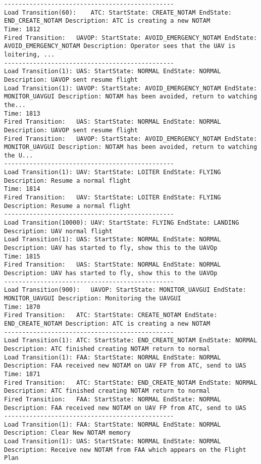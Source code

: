 \begin{spacing}{1}
\begin{verbatim}
-----------------------------------------------
Load Transition(60):	ATC: StartState: CREATE_NOTAM EndState: END_CREATE_NOTAM Description: ATC is creating a new NOTAM
Time: 1812
Fired Transition:	UAVOP: StartState: AVOID_EMERGENCY_NOTAM EndState: AVOID_EMERGENCY_NOTAM Description: Operator sees that the UAV is loitering, ...
-----------------------------------------------
Load Transition(1):	UAS: StartState: NORMAL EndState: NORMAL Description: UAVOP sent resume flight
Load Transition(1):	UAVOP: StartState: AVOID_EMERGENCY_NOTAM EndState: MONITOR_UAVGUI Description: NOTAM has been avoided, return to watching the...
Time: 1813
Fired Transition:	UAS: StartState: NORMAL EndState: NORMAL Description: UAVOP sent resume flight
Fired Transition:	UAVOP: StartState: AVOID_EMERGENCY_NOTAM EndState: MONITOR_UAVGUI Description: NOTAM has been avoided, return to watching the U...
-----------------------------------------------
Load Transition(1):	UAV: StartState: LOITER EndState: FLYING Description: Resume a normal flight
Time: 1814
Fired Transition:	UAV: StartState: LOITER EndState: FLYING Description: Resume a normal flight
-----------------------------------------------
Load Transition(10000):	UAV: StartState: FLYING EndState: LANDING Description: UAV normal flight
Load Transition(1):	UAS: StartState: NORMAL EndState: NORMAL Description: UAV has started to fly, show this to the UAVOp
Time: 1815
Fired Transition:	UAS: StartState: NORMAL EndState: NORMAL Description: UAV has started to fly, show this to the UAVOp
-----------------------------------------------
Load Transition(900):	UAVOP: StartState: MONITOR_UAVGUI EndState: MONITOR_UAVGUI Description: Monitoring the UAVGUI
Time: 1870
Fired Transition:	ATC: StartState: CREATE_NOTAM EndState: END_CREATE_NOTAM Description: ATC is creating a new NOTAM
-----------------------------------------------
Load Transition(1):	ATC: StartState: END_CREATE_NOTAM EndState: NORMAL Description: ATC finished creating NOTAM return to normal
Load Transition(1):	FAA: StartState: NORMAL EndState: NORMAL Description: FAA received new NOTAM on UAV FP from ATC, send to UAS
Time: 1871
Fired Transition:	ATC: StartState: END_CREATE_NOTAM EndState: NORMAL Description: ATC finished creating NOTAM return to normal
Fired Transition:	FAA: StartState: NORMAL EndState: NORMAL Description: FAA received new NOTAM on UAV FP from ATC, send to UAS
-----------------------------------------------
Load Transition(1):	FAA: StartState: NORMAL EndState: NORMAL Description: Clear New NOTAM memory
Load Transition(1):	UAS: StartState: NORMAL EndState: NORMAL Description: Receive new NOTAM from FAA which appears on the Flight Plan

\end{verbatim}
\end{spacing}
